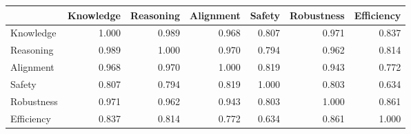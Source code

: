 \begin{tabular}{lrrrrrr}
\toprule
 & Knowledge & Reasoning & Alignment & Safety & Robustness & Efficiency \\
\midrule
Knowledge & 1.000 & 0.989 & 0.968 & 0.807 & 0.971 & 0.837 \\
Reasoning & 0.989 & 1.000 & 0.970 & 0.794 & 0.962 & 0.814 \\
Alignment & 0.968 & 0.970 & 1.000 & 0.819 & 0.943 & 0.772 \\
Safety & 0.807 & 0.794 & 0.819 & 1.000 & 0.803 & 0.634 \\
Robustness & 0.971 & 0.962 & 0.943 & 0.803 & 1.000 & 0.861 \\
Efficiency & 0.837 & 0.814 & 0.772 & 0.634 & 0.861 & 1.000 \\
\bottomrule
\end{tabular}
